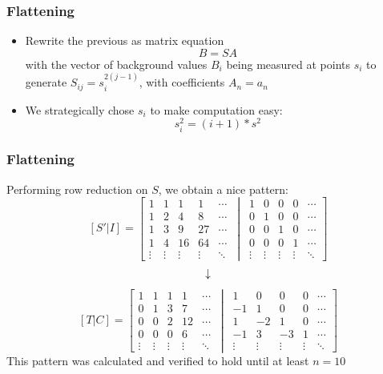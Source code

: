\documentclass{beamer}
\begin{document}
\begin{frame}
	\frametitle{Flattening}
	\begin{itemize}
		\item<1-> Rewrite the previous as matrix equation
			\[B = SA\]
			with the vector of background values \(B_i\) being measured at points \(s_i\) to generate \(S_{ij} = s_i^{2(j-1)}\), with coefficients \(A_n = a_n\) 
		\item<2-> We strategically chose \(s_i\) to make computation easy:
			\[s_i^2 = (i+1)*s^2\]
	\end{itemize}
\end{frame}

\begin{frame}
	\frametitle{Flattening}
	Performing row reduction on \(S\), we obtain a nice pattern:
	\[ [S'|I] = \left[ \begin{matrix} 1 & 1 & 1 & 1 & \cdots \\
			1 & 2 & 4 & 8 & \cdots \\
			1 & 3 & 9 & 27 & \cdots \\
			1 & 4 & 16 & 64 & \cdots\\
			\vdots & \vdots & \vdots & \vdots & \ddots
	\end{matrix} \,\middle\vert\, \begin{matrix}
			1 & 0 & 0 & 0 & \cdots \\
			0 & 1 & 0 & 0 & \cdots \\
			0 & 0 & 1 & 0 & \cdots \\
			0 & 0 & 0 & 1 & \cdots\\
			\vdots & \vdots & \vdots & \vdots & \ddots
	\end{matrix} \right]\]
	\[\downarrow\]
	\[ [T|C] = \left[ \begin{matrix}
			1 & 1 & 1 & 1 & \cdots\\
			0 & 1 & 3 & 7 & \cdots\\
			0 & 0 & 2 & 12 & \cdots\\
			0 & 0 & 0 & 6 & \cdots \\
			\vdots & \vdots & \vdots & \vdots & \ddots
	\end{matrix} \,\middle\vert\, \begin{matrix}
			1 & 0 & 0 & 0 &\cdots \\
			-1 & 1 & 0 & 0 &\cdots \\
			1 & -2 & 1 & 0 &\cdots \\
			-1 & 3 & -3 & 1 &\cdots \\
			\vdots & \vdots & \vdots & \vdots & \ddots
	\end{matrix} \right]\]
	This pattern was calculated and verified to hold until at least \(n=10\)
\end{frame}
\end{document}
